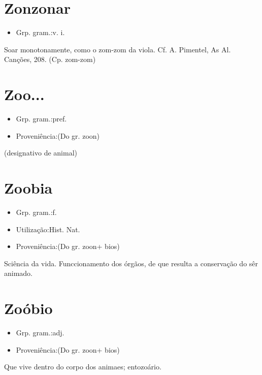 \section{Zonzonar}
\begin{itemize}
\item {Grp. gram.:v. i.}
\end{itemize}
Soar monotonamente, como o zom-zom da viola. Cf. A. Pimentel, \textunderscore As Al. Canções\textunderscore , 208.
(Cp. \textunderscore zom-zom\textunderscore )
\section{Zoo...}
\begin{itemize}
\item {Grp. gram.:pref.}
\end{itemize}
\begin{itemize}
\item {Proveniência:(Do gr. \textunderscore zoon\textunderscore )}
\end{itemize}
(designativo de \textunderscore animal\textunderscore )
\section{Zoobia}
\begin{itemize}
\item {Grp. gram.:f.}
\end{itemize}
\begin{itemize}
\item {Utilização:Hist. Nat.}
\end{itemize}
\begin{itemize}
\item {Proveniência:(Do gr. \textunderscore zoon\textunderscore  + \textunderscore bios\textunderscore )}
\end{itemize}
Sciência da vida.
Funccionamento dos órgãos, de que resulta a conservação do sêr animado.
\section{Zoóbio}
\begin{itemize}
\item {Grp. gram.:adj.}
\end{itemize}
\begin{itemize}
\item {Proveniência:(Do gr. \textunderscore zoon\textunderscore  + \textunderscore bios\textunderscore )}
\end{itemize}
Que vive dentro do corpo dos animaes; entozoário.
